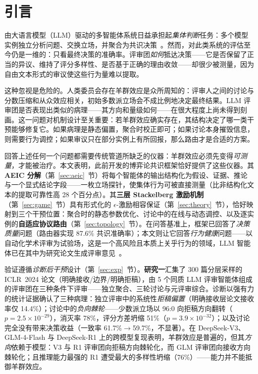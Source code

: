 \section{引言}
\label{sec:intro}

由大语言模型（LLM）驱动的多智能体系统日益承担起\emph{集体判断}任务：多个模型实例独立分析问题、交换立场，并聚合为共识决策~\cite{han2024llm,tran2025multiagent,wang2023selfconsistency,du2024improving}。然而，对此类系统的评估至今仍是一维的：只看最终决策的准确率。评审团\emph{如何}抵达决策——它是否保留了正当的异议、维持了评分多样性、是否基于正确的理由收敛——却很少被测量，因为自由文本形式的审议使这些行为量难以提取。

这种忽视是危险的。人类委员会存在羊群效应是众所周知的：评审人之间的讨论与分数压缩和从众效应相关，初始多数派立场会不成比例地决定最终结果。LLM 评审团是否表现出类似的病理——其方向和量级如何——在很大程度上尚未得到刻画。这一问题对机制设计至关重要：若羊群效应确实存在，其结构决定了哪一类干预能够修复它。如果病理是静态偏置，聚合时校正即可；如果讨论本身摧毁信息，则需要行为调控；如果审议只在部分实例上有所回报，那么路由才是合适的方案。

回答上述任何一个问题都需要传统管道所缺乏的仪器：羊群效应必须先变得\emph{可测量}，才能被治疗。本文表明，此前开发的博弈论共识框架恰好提供了这些仪器。其 \textbf{AEIC 分解}（第~\ref{sec:aeic}~节）将每个智能体的输出结构化为假设、证据、推论与一个显式结论字段——一枚立场探针，使集体行为可被直接测量（比非结构化文本的提取可靠性高 28 个百分点）。其\textbf{三层 Stackelberg 激励机制}（第~\ref{sec:game}~节）具有形式化的 $\epsilon$-激励相容保证（第~\ref{sec:theory}~节），恰好映射到三个干预位置：聚合时的静态参数优化、讨论中的在线与动态调控、以及逐实例的\textbf{自适应协议路由}（第~\ref{sec:topology}~节）。在问答基准上，框架已回答了\emph{决策质量}问题（路由器实现 87.6\% 共识准确率）；本文则让它回答\emph{行为健康}问题——以自动化学术评审为试验场，这是一个高风险且本质上关乎行为的领域，LLM 智能体已在其中为研究论文生成评审意见~\cite{liang2024llmreview,jin2024agentreview}。

验证遵循\emph{诊断后干预}设计（第~\ref{sec:exp}~节）。\textbf{研究一}汇集了 300 篇分层采样的 ICLR~2024 论文（明确接收/边界/明确拒稿），由 5 个同质 LLM 评审智能体组成的评审团在三种条件下评审——独立聚合、三轮讨论与元评审综合。诊断以强有力的统计证据确认了三种病理：独立评审中的系统性\emph{拒稿偏置}（明确接收层论文接收率仅 14.4\%）；讨论中的\emph{负向棘轮}——少数派立场以 96:0 向拒稿方向翻转（$p{=}2.5{\times}10^{-29}$），消灭率 78\%，评分方差坍缩 51\%（$p{=}3.9{\times}10^{-32}$）；以及讨论完全没有带来决策收益（一致率 61.7\%$\to$59.7\%，不显著）。在 DeepSeek-V3、GLM-4-Flash 与 DeepSeek-R1 上的跨模型复现表明，羊群效应是普遍的，但其\emph{方向}依赖于模型：V3 与 R1 评审团向拒稿方向棘轮化，而 GLM 评审团向接收方向棘轮化；且推理能力最强的 R1 遭受最大的多样性坍缩（76\%）——能力并不能抵御羊群效应。

